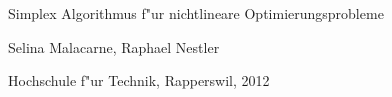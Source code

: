 \begin{titlepage}
\HRule
\vspace*{10pt}
\begin{flushright}
{\Huge
Simplex Algorithmus f"ur nichtlineare Optimierungsprobleme}
\end{flushright}
\HRule
\begin{flushright}
\vspace{30pt}
\LARGE
Selina Malacarne, Raphael Nestler
\end{flushright}
\begin{center}
Hochschule f"ur Technik, Rapperswil, 2012
\end{center}
\end{titlepage}
